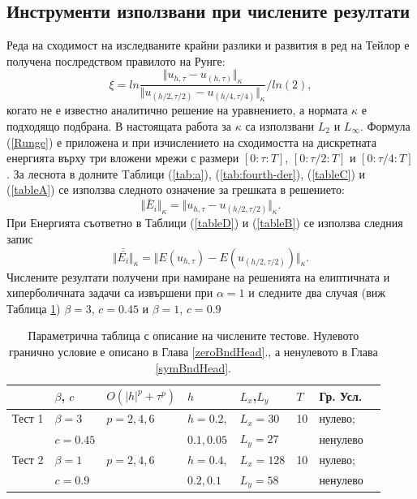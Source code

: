 \documentclass[a4paper]{article}
\newcommand{\rf}[1]{(\ref{#1})}
\theoremstyle{remark}
\begin{document}
\subsection{Инструменти използвани при числените резултати}\label{Instruments}

Реда на сходимост на изследваните крайни разлики и развития в ред на Тейлор е получена послредством правилото на Рунге:
\begin{equation}\label{Runge}
\xi = ln  \frac{\Vert u_{h,\tau} - u_{(h,\tau)} \Vert_\kappa } {\Vert  u_{(h/2,\tau/2)} - u_{(h/4,\tau/4)} \Vert_\kappa  } / ln(2),
\end{equation}
когато не е известно аналитично решение на уравнението, а нормата $\kappa$ е подходящо подбрана. В настоящата работа за $\kappa$ са използвани $L_2$ и $L_\infty$. Формула \rf{Runge} е приложена и при изчислението на сходимостта на дискретната енергията върху три вложени мрежи с размери $[0:\tau:T]$, $[0:\tau/2:T]$ и $[0:\tau/4:T]$. За леснота в долните Tаблици \rf{tab:a}, \rf{tab:fourth-der}, \rf{tableC} и \rf{tableA} се използва следното означение за грешката в решението:
$$\Vert \bar E_i \Vert_\kappa =  \Vert u_{h,\tau} - u_{(h/2,\tau/2)} \Vert_\kappa.$$ 
При Енергията съответно в Таблици \rf{tableD} и \rf{tableB} се използва следния запис
$$\Vert \bar{\bar{ E_i}} \Vert_\kappa=  \Vert E(u_{h,\tau}) - E(u_{(h/2,\tau/2)}) \Vert_\kappa.$$ 
Числените резултати получени при намиране на решенията на елиптичната и хиперболичната задачи са извършени при $\alpha = 1$ и следните два случая (виж Таблица \ref{tableP}) $\beta = 3$, $c=0.45$ и $\beta = 1$, $c=0.9$ \begin{table}
\centering
\small
		\begin{tabular}{||c|l|l|l|l|l|l|l||}
			\hline
			\hline
          &    $\beta$, $c$ 	 & $O(|h|^p+\tau^p)$   &      $h$       	& $L_x$,$L_y$   	&  $T$    	& Гр. Усл.  \\
   			\hline 
			\hline
Тест 1  &      $\beta = 3$   &      $p=2, 4, 6$    	&    $h=0.2,$       	& $L_x = 30$     	&    10    	&    нулево;  \\
          &      $c=0.45$       &                           	&    $ 0.1, 0.05$   	& $L_y=27	$    	&        		&     ненулево 		\\
	   		\hline
			\hline 
Тест 2	&      $\beta = 1$	&      $p=2, 4, 6$    	&     $h=0.4,$      	& $L_x = 128$    &   10    	&   нулево;  \\
           &      $c=0.9$      	&                       		&      $0.2, 0.1$     & $L_y=58$         	&          		&   ненулево   \\
	   \hline
			\hline 
		\end{tabular}
\caption{Параметрична таблица с описание на числените тестове. Нулевото гранично условие е описано в Глава \ref{zeroBndHead}., а ненулевото в Глава \ref{symBndHead}.}
\label{tableP}
\end{table}
\end{document}
